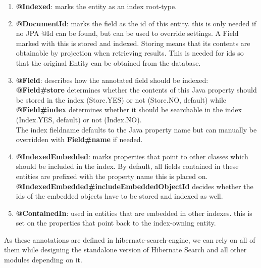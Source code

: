 \begin{enumerate}
	\item \textbf{@Indexed}: marks the entity as an index root-type.
	\item \textbf{@DocumentId}: marks the field as the id of this entity. this is only needed if no JPA @Id can be found, but can be used to override settings. A Field marked with this
	is stored and indexed. Storing means that its contents are obtainable by projection when retrieving results. This is needed for ids so that the original Entity can be obtained from the database.
	\item \textbf{@Field}: describes how the annotated field should be indexed:
	\\\textbf{@Field\#store} determines whether the contents of this Java property should be stored in the index (Store.YES) or not (Store.NO, default) while \textbf{@Field\#index} determines whether it should be searchable in the index (Index.YES, default) or not (Index.NO). 
	\\
	The index fieldname defaults to the Java property name but can manually be overridden with \textbf{Field\#name} if needed.
	\item \textbf{@IndexedEmbedded}: marks properties that point to other classes which should be included in the index. By default, all fields contained in these entities are prefixed with the property name this is placed on. \\
	\textbf{@IndexedEmbedded\#includeEmbeddedObjectId} decides whether the ids of the embedded objects have to be stored and indexed as well.
	\item \textbf{@ContainedIn}: used in entities that are embedded in other indexes. this is set on the properties that point back to the index-owning entity.
\end{enumerate}
\noindent
As these annotations are defined in hibernate-search-engine, we can rely on all of them while designing the standalone version of Hibernate Search and all other modules depending on it.

